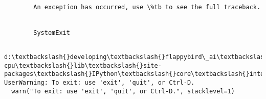 \documentclass[11pt]{article}
\begin{document}
    \begin{Verbatim}[commandchars=\\\{\}]

        An exception has occurred, use \%tb to see the full traceback.
    

        SystemExit
    

    \end{Verbatim}

    \begin{Verbatim}[commandchars=\\\{\}]
d:\textbackslash{}developing\textbackslash{}flappybird\_ai\textbackslash{}venv-cpu\textbackslash{}lib\textbackslash{}site-packages\textbackslash{}IPython\textbackslash{}core\textbackslash{}interactiveshell.py:2971: UserWarning: To exit: use 'exit', 'quit', or Ctrl-D.
  warn("To exit: use 'exit', 'quit', or Ctrl-D.", stacklevel=1)

    \end{Verbatim}


    
    
    
    
\end{document}
